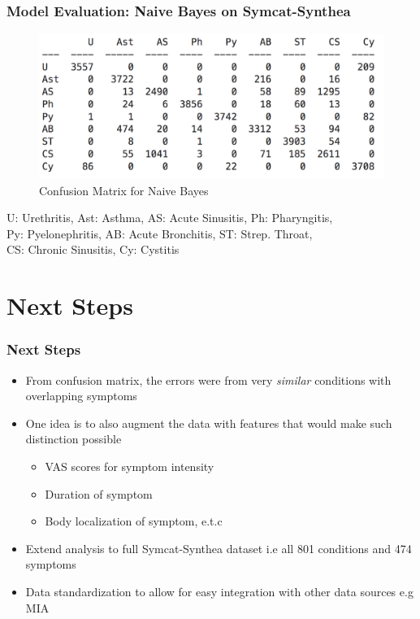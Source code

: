 \documentclass{beamer}
\begin{document}
		\begin{frame}
			\frametitle{Model Evaluation: Naive Bayes on Symcat-Synthea}
			\begin{figure}
				\includegraphics[width=\linewidth]{figs/naive_bayes_confusion_matrix.png}
				\caption{Confusion Matrix for Naive Bayes}
			\end{figure}
			
			U: Urethritis,  Ast: Asthma,  AS: Acute Sinusitis,  Ph: Pharyngitis, \\
			Py: Pyelonephritis,  AB: Acute Bronchitis,  ST: Strep. Throat,\\
			CS: Chronic Sinusitis,  Cy: Cystitis
		\end{frame}

\section{Next Steps}
\begin{frame}
\frametitle{Next Steps}
\begin{itemize}
	\item From confusion matrix, the errors were from very \textit{similar} conditions with overlapping symptoms
	\item One idea is to also augment the data with features that would make such distinction possible
	\begin{itemize}
		\item VAS scores for symptom intensity
		\item Duration of symptom
		\item Body localization of symptom, e.t.c
	\end{itemize}
	\item Extend analysis to full Symcat-Synthea dataset i.e all 801 conditions and 474 symptoms
	\item Data standardization to allow for easy integration with other data sources e.g MIA
\end{itemize}
\end{frame}
\end{document}
